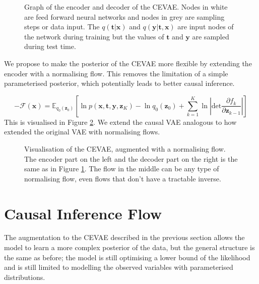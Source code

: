 \documentclass{report}
\newcommand{\bt}{\mathbf{t}}
\newcommand{\bx}{\mathbf{x}}
\newcommand{\by}{\mathbf{y}}
\newcommand{\bz}{\mathbf{z}}
\newcommand{\parfrac}[2]{\frac{\partial #1}{\partial#2}}
\begin{document}
\begin{figure}
    \centering
    
    
    \caption{Graph of the encoder and decoder of the CEVAE. Nodes in white are feed forward neural networks and nodes in grey are sampling steps or data input. The $q(\bt|\bx)$ and $q(\by|\bt, \bx)$ are input nodes of the network during training but the values of $\bt$ and $\by$ are sampled during test time.}
    \label{fig:cevae_graph}
\end{figure}


We propose to make the posterior of the CEVAE more flexible by extending the encoder with a normalising flow. This removes the limitation of a simple parameterised posterior, which potentially leads to better causal inference.

\begin{equation}
    -\mathcal{F}(\bx) = \mathbb{E}_{q_0(\bz_0)}\left[\ln p(\bx, \bt, \by, \bz_K) - \ln q_0(\bz_0) + \sum\limits^K_{k=1}\ln \left|\text{det} \parfrac{f_k}{\bz_{k-1}} \right| \right]
\end{equation}
This is visualised in Figure \ref{fig:cenf_with_vae}. We extend the causal VAE analogous to how \textcite{rezende2016variational} extended the original VAE with normalising flows.

\begin{figure}
    \centering
    
    \caption{Visualisation of the CEVAE, augmented with a normalising flow. The encoder part on the left and the decoder part on the right is the same as in Figure \ref{fig:cevae_graph}. The flow in the middle can be any type of normalising flow, even flows that don't have a tractable inverse.}
    \label{fig:cenf_with_vae}
\end{figure}

\newpage
\section{Causal Inference Flow}\label{section:CIF}

The augmentation to the CEVAE described in the previous section allows the model to learn a more complex posterior of the data, but the general structure is the same as before; the model is still optimising a lower bound of the likelihood and is still limited to modelling the observed variables with parameterised distributions.
\end{document}
